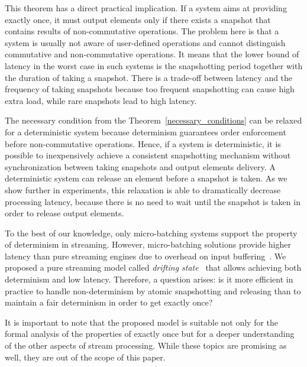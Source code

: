 This theorem has a direct practical implication. If a system aims at providing exactly once, it must output elements only if there exists a snapshot that contains results of non-commutative operations. The problem here is that a system is usually not aware of user-defined operations and cannot distinguish commutative and non-commutative operations. It means that the lower bound of latency in the worst case in such systems is the snapshotting period together with the duration of taking a snapshot. There is a trade-off between latency and the frequency of taking snapshots because too frequent snapshotting can cause high extra load, while rare snapshots lead to high latency.

The necessary condition from the Theorem~\ref{necessary_conditions} can be relaxed for a deterministic system 
because determinism guarantees order enforcement before non-commutative operations. Hence, if a system is deterministic, it is possible to inexpensively achieve a consistent snapshotting mechanism without synchronization between taking snapshots and output elements delivery. A deterministic system can release an element before a snapshot is taken. As we show further in experiments, this relaxation is able to dramatically decrease processing latency, because there is no need to wait until the snapshot is taken in order to release output elements.

To the best of our knowledge, only micro-batching systems support the property of determinism in streaming. However, micro-batching solutions provide higher latency than pure streaming engines due to overhead on input buffering~\cite{karimov2018benchmarking}. We proposed a pure streaming model called {\em drifting state}~\cite{we2018adbis} that allows achieving both determinism and low latency. Therefore, a question arises: is it more efficient in practice to handle non-determinism by atomic snapshotting and releasing than to maintain a fair determinism in order to get exactly once? 

It is important to note that the proposed model is suitable not only for the formal analysis of the properties of exactly once but for a deeper understanding of the other aspects of stream processing. While these topics are promising as well, they are out of the scope of this paper.
